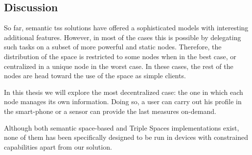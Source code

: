 


\subsection{Discussion}


So far, semantic \aclp{ts} solutions have offered a sophisticated models with interesting additional features.
However, in most of the cases this is possible by delegating such tasks on a subset of more powerful and static nodes.
Therefore, the distribution of the space is restricted to some nodes when in the best case, or centralized in a unique node in the worst case.
In these cases, the rest of the nodes are head toward the use of the space as simple clients.


In this thesis we will explore the most decentralized case: the one in which each node manages its own information.
Doing so, a user can carry out his profile in the smart-phone or a sensor can provide the last measures on-demand.



Although both semantic space-based and Triple Spaces implementations exist, none of them has been specifically designed to be run in devices with constrained capabilities apart from our solution.



